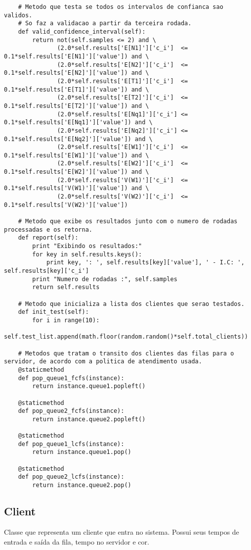\begin{lstlisting}
    # Metodo que testa se todos os intervalos de confianca sao validos.
    # So faz a validacao a partir da terceira rodada.
    def valid_confidence_interval(self):
        return not(self.samples <= 2) and \
               (2.0*self.results['E[N1]']['c_i']  <= 0.1*self.results['E[N1]']['value']) and \
               (2.0*self.results['E[N2]']['c_i']  <= 0.1*self.results['E[N2]']['value']) and \
               (2.0*self.results['E[T1]']['c_i']  <= 0.1*self.results['E[T1]']['value']) and \
               (2.0*self.results['E[T2]']['c_i']  <= 0.1*self.results['E[T2]']['value']) and \
               (2.0*self.results['E[Nq1]']['c_i'] <= 0.1*self.results['E[Nq1]']['value']) and \
               (2.0*self.results['E[Nq2]']['c_i'] <= 0.1*self.results['E[Nq2]']['value']) and \
               (2.0*self.results['E[W1]']['c_i']  <= 0.1*self.results['E[W1]']['value']) and \
               (2.0*self.results['E[W2]']['c_i']  <= 0.1*self.results['E[W2]']['value']) and \
               (2.0*self.results['V(W1)']['c_i']  <= 0.1*self.results['V(W1)']['value']) and \
               (2.0*self.results['V(W2)']['c_i']  <= 0.1*self.results['V(W2)']['value'])

    # Metodo que exibe os resultados junto com o numero de rodadas processadas e os retorna.
    def report(self):
        print "Exibindo os resultados:"
        for key in self.results.keys():
            print key, ': ', self.results[key]['value'], ' - I.C: ', self.results[key]['c_i']
        print "Numero de rodadas :", self.samples
        return self.results
        
    # Metodo que inicializa a lista dos clientes que serao testados.
    def init_test(self):
        for i in range(10):
            self.test_list.append(math.floor(random.random()*self.total_clients))
    
    # Metodos que tratam o transito dos clientes das filas para o servidor, de acordo com a politica de atendimento usada.
    @staticmethod
    def pop_queue1_fcfs(instance):
        return instance.queue1.popleft()
        
    @staticmethod
    def pop_queue2_fcfs(instance):
        return instance.queue2.popleft()
        
    @staticmethod
    def pop_queue1_lcfs(instance):
        return instance.queue1.pop()
        
    @staticmethod
    def pop_queue2_lcfs(instance):
        return instance.queue2.pop()
\end{lstlisting}

\subsection{Client}
Classe que representa um cliente que entra no sistema. Possui seus tempos de entrada e saída da fila, tempo no servidor e cor.\\


